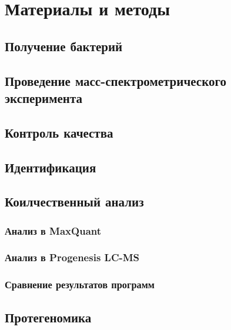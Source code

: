 \section{Материалы и методы}

\subsection{Получение бактерий}

\subsection{Проведение масс-спектрометрического эксперимента}

\subsection{Контроль качества}

\subsection{Идентификация}

\subsection{Коилчественный анализ}
\subsubsection{Анализ в MaxQuant}
\subsubsection{Анализ в Progenesis LC-MS}
\subsubsection{Сравнение результатов программ}

\subsection{Протегеномика}

\newpage
